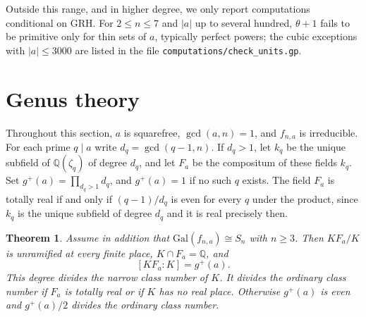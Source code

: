\documentclass[11pt]{article}
\newtheorem{theorem}{Theorem}
\theoremstyle{definition}
\theoremstyle{remark}
\newcommand{\Q}{\mathbb{Q}}
\newcommand{\Gal}{\mathrm{Gal}}
\begin{document}
Outside this range, and in higher degree, we only report computations conditional
on GRH. For $2\le n\le 7$ and $|a|$ up to several hundred, $\theta+1$ fails to be
primitive only for thin sets of $a$, typically perfect powers; the cubic
exceptions with $|a|\le 3000$ are listed in the file
\texttt{computations/check\_units.gp}.

\section{Genus theory}\label{sec:class}

Throughout this section, $a$ is squarefree, $\gcd(a,n)=1$, and $f_{n,a}$ is
irreducible. For each prime $q\mid a$ write $d_q=\gcd(q-1,n)$. If $d_q>1$, let
$k_q$ be the unique subfield of $\Q(\zeta_q)$ of degree $d_q$, and let $F_a$ be
the compositum of these fields $k_q$. Set $g^{+}(a)=\prod_{d_q>1}d_q$, and
$g^{+}(a)=1$ if no such $q$ exists. The field $F_a$ is totally real if and only
if $(q-1)/d_q$ is even for every $q$ under the product, since $k_q$ is the unique
subfield of degree $d_q$ and it is real precisely then.

\begin{theorem}\label{thm:genus}
Assume in addition that $\Gal(f_{n,a})\cong S_n$ with $n\ge 3$. Then $KF_a/K$ is
unramified at every finite place, $K\cap F_a=\Q$, and
\[
[KF_a:K]=g^{+}(a).
\]
This degree divides the narrow class number of $K$. It divides the ordinary
class number if $F_a$ is totally real or if $K$ has no real place. Otherwise
$g^{+}(a)$ is even and $g^{+}(a)/2$ divides the ordinary class number.
\end{theorem}
\end{document}
